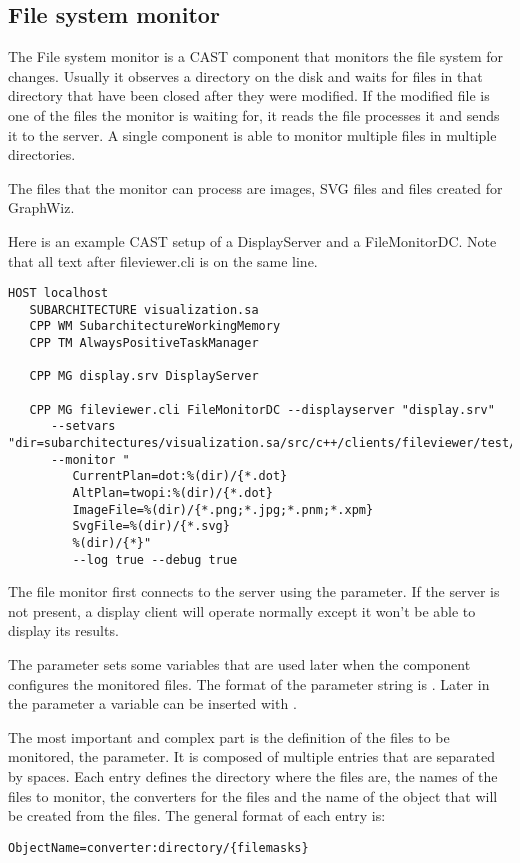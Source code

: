 \subsection{File system monitor}

The File system monitor is a CAST component that monitors the file system for
changes. Usually it observes a directory on the disk and waits for files in that
directory that have been closed after they were modified. If the modified file
is one of the files the monitor is waiting for, it reads the file processes it
and sends it to the server. A single component is able to monitor multiple files
in multiple directories.

The files that the monitor can process are images, SVG files and files created
for GraphWiz.

Here is an example CAST setup of a DisplayServer and a FileMonitorDC. Note that
all text after fileviewer.cli is on the same line.

\begin{Verbatim}[fontsize=\scriptsize,gobble=3]
   HOST localhost
   SUBARCHITECTURE visualization.sa 
   CPP WM SubarchitectureWorkingMemory
   CPP TM AlwaysPositiveTaskManager

   CPP MG display.srv DisplayServer

   CPP MG fileviewer.cli FileMonitorDC --displayserver "display.srv"
      --setvars "dir=subarchitectures/visualization.sa/src/c++/clients/fileviewer/test/xdata"
      --monitor "
         CurrentPlan=dot:%(dir)/{*.dot}
         AltPlan=twopi:%(dir)/{*.dot}
         ImageFile=%(dir)/{*.png;*.jpg;*.pnm;*.xpm}
         SvgFile=%(dir)/{*.svg}
         %(dir)/{*}"
         --log true --debug true
\end{Verbatim}

The file monitor first connects to the server using the 
parameter. If the server is not present, a display client will operate normally
except it won't be able to display its results.

The parameter  sets some variables that are used later when
the component configures the monitored files. The format of the parameter
string is . Later in the parameter
 a variable can be inserted with .

The most important and complex part is the definition of the files to be
monitored, the  parameter. It is composed of multiple entries
that are separated by spaces. Each entry defines the directory where the files
are, the names of the files to monitor, the converters for the files and the
name of the object that will be created from the files. The general format of
each entry is:
\begin{Verbatim}[fontsize=\scriptsize,gobble=3]
   ObjectName=converter:directory/{filemasks}
\end{Verbatim}

